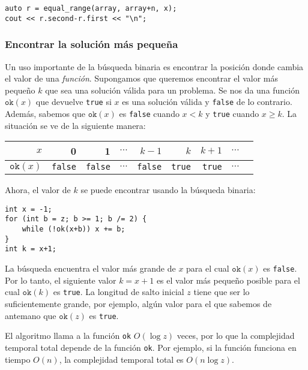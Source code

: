 \begin{lstlisting}
auto r = equal_range(array, array+n, x);
cout << r.second-r.first << "\n";
\end{lstlisting}

\subsubsection{Encontrar la solución más pequeña}

Un uso importante de la búsqueda binaria es
encontrar la posición donde cambia el valor de una \emph{función}.
Supongamos que queremos encontrar el valor más pequeño $k$
que sea una solución válida para un problema.
Se nos da una función $\texttt{ok}(x)$
que devuelve \texttt{true} si $x$ es una solución válida
y \texttt{false} de lo contrario.
Además, sabemos que $\texttt{ok}(x)$ es \texttt{false}
cuando $x<k$ y \texttt{true} cuando $x \ge k$.
La situación se ve de la siguiente manera:

\begin{center}
\begin{tabular}{r|rrrrrrrr}
$x$ & 0 & 1 & $\cdots$ & $k-1$ & $k$ & $k+1$ & $\cdots$ \\
\hline
$\texttt{ok}(x)$ & \texttt{false} & \texttt{false}
& $\cdots$ & \texttt{false} & \texttt{true} & \texttt{true} & $\cdots$ \\
\end{tabular}
\end{center}

\noindent
Ahora, el valor de $k$ se puede encontrar usando la búsqueda binaria:

\begin{lstlisting}
int x = -1;
for (int b = z; b >= 1; b /= 2) {
    while (!ok(x+b)) x += b;
}
int k = x+1;
\end{lstlisting}

La búsqueda encuentra el valor más grande de $x$ para el cual
$\texttt{ok}(x)$ es \texttt{false}.
Por lo tanto, el siguiente valor $k=x+1$
es el valor más pequeño posible para el cual
$\texttt{ok}(k)$ es \texttt{true}.
La longitud de salto inicial $z$ tiene que ser
lo suficientemente grande, por ejemplo, algún valor
para el que sabemos de antemano que $\texttt{ok}(z)$ es \texttt{true}.

El algoritmo llama a la función \texttt{ok}
$O(\log z)$ veces, por lo que la complejidad temporal total
depende de la función \texttt{ok}.
Por ejemplo, si la función funciona en tiempo $O(n)$,
la complejidad temporal total es $O(n \log z)$.

